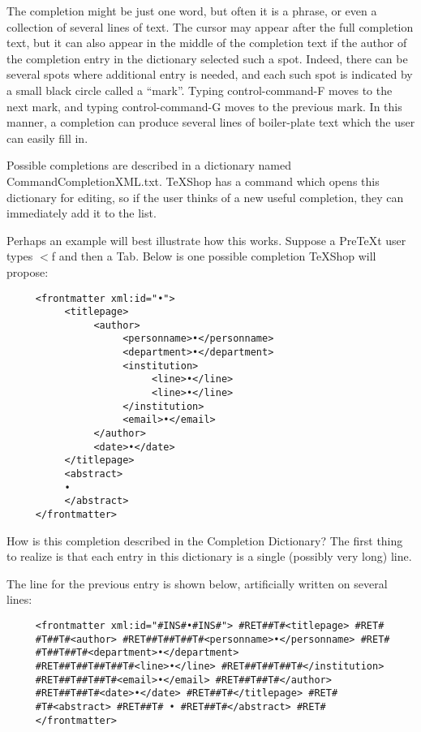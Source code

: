\documentclass[11pt, oneside]{article}   	%
\begin{document}
The completion might be just one word, but often it is a phrase, or even a collection of several lines of text. The cursor may appear after the full completion text, but it can also appear in the middle of the completion text if the author of the completion entry in the dictionary selected such a spot. Indeed, there can be several spots where additional entry is needed, and each such spot is indicated by a small black circle called a ``mark''. Typing control-command-F moves to the next mark, and typing control-command-G moves to the previous mark. In this manner, a completion can produce several lines of boiler-plate text which the user can easily fill in.

Possible completions are described in a dictionary named CommandCompletionXML.txt. TeXShop has a command which opens this dictionary for editing, so if the user thinks of a new useful completion, they can immediately add it to the list.

Perhaps an example will best illustrate how this works. Suppose a PreTeXt user types $<$f and then a Tab.
Below is  one possible completion TeXShop will propose:

\begin{verbatim}
     <frontmatter xml:id="•"> 
          <titlepage> 
               <author> 
                    <personname>•</personname> 
                    <department>•</department> 
                    <institution> 
                         <line>•</line> 
                         <line>•</line> 
                    </institution> 
                    <email>•</email> 
               </author> 
               <date>•</date> 
          </titlepage> 
          <abstract> 
          • 
          </abstract> 
     </frontmatter>
\end{verbatim}

How is this completion described in the Completion Dictionary? The first thing to realize is that each entry in this dictionary is a single (possibly very long) line.

The line for the previous entry is shown below, artificially written on several lines:
\begin{verbatim}
     <frontmatter xml:id="#INS#•#INS#"> #RET##T#<titlepage> #RET#
     #T##T#<author> #RET##T##T##T#<personname>•</personname> #RET#
     #T##T##T#<department>•</department>
     #RET##T##T##T##T#<line>•</line> #RET##T##T##T#</institution> 
     #RET##T##T##T#<email>•</email> #RET##T##T#</author> 
     #RET##T##T#<date>•</date> #RET##T#</titlepage> #RET#
     #T#<abstract> #RET##T# • #RET##T#</abstract> #RET#
     </frontmatter>
\end{verbatim}
\end{document}
